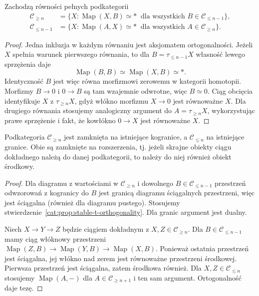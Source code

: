 \begin{stwierdzenie}\label{cat:prop:stable-t-orthogonality}
Zachodzą równości pełnych podkategorii
\[
\begin{aligned}
 \mathcal C_{\geq n}
 &=\{X:\operatorname{Map}(X,B)\simeq *\
                  \text{ dla wszystkich } B\in\mathcal C_{\leq n-1}\},\\
 \mathcal C_{\leq n-1}
 &=\{X:\operatorname{Map}(A,X)\simeq *\
                  \text{ dla wszystkich } A\in\mathcal C_{\geq n}\}.
\end{aligned}
\]
\end{stwierdzenie}
\begin{proof}
Jedna inkluzja w każdym równaniu jest aksjomatem ortogonalności. Jeżeli $X$ spełnia warunek pierwszego równania, to dla $B=\tau_{\leq n-1}X$ własność lewego sprzężenia daje
\[
 \operatorname{Map}(B,B)\simeq\operatorname{Map}(X,B)\simeq *.
\]
Identyczność $B$ jest więc równa morfizmowi zerowemu w kategorii homotopii. Morfizmy $B\to0$ i $0\to B$ są tam wzajemnie odwrotne, więc $B\simeq0$. Ciąg obcięcia identyfikuje $X$ z $\tau_{\geq n}X$, gdyż włókno morfizmu $X\to0$ jest równoważne $X$. Dla drugiego równania stosujemy analogiczny argument do $A=\tau_{\geq n}X$, wykorzystując prawe sprzężenie i fakt, że kowłókno $0\to X$ jest równoważne $X$.
\end{proof}

\begin{wniosek}\label{cat:cor:stable-t-closure}
Podkategoria $\mathcal C_{\geq n}$ jest zamknięta na istniejące kogranice, a $\mathcal C_{\leq n}$ na istniejące granice. Obie są zamknięte na rozszerzenia, tj. jeżeli skrajne obiekty ciągu dokładnego należą do danej podkategorii, to należy do niej również obiekt środkowy.
\end{wniosek}
\begin{proof}
Dla diagramu z wartościami w $\mathcal C_{\geq n}$ i dowolnego $B\in\mathcal C_{\leq n-1}$ przestrzeń odwzorowań z kogranicy do $B$ jest granicą diagramu ściągalnych przestrzeni, więc jest ściągalna (również dla diagramu pustego). Stosujemy stwierdzenie~\ref{cat:prop:stable-t-orthogonality}. Dla granic argument jest dualny.

Niech $X\to Y\to Z$ będzie ciągiem dokładnym z $X,Z\in\mathcal C_{\geq n}$. Dla $B\in\mathcal C_{\leq n-1}$ mamy ciąg włóknowy przestrzeni $\operatorname{Map}(Z,B)\to\operatorname{Map}(Y,B)\to\operatorname{Map}(X,B)$. Ponieważ ostatnia przestrzeń jest ściągalna, jej włókno nad zerem jest równoważne przestrzeni środkowej. Pierwsza przestrzeń jest ściągalna, zatem środkowa również. Dla $X,Z\in\mathcal C_{\leq n}$ stosujemy $\operatorname{Map}(A,-)$ dla $A\in\mathcal C_{\geq n+1}$ i ten sam argument. Ortogonalność daje tezę.
\end{proof}

